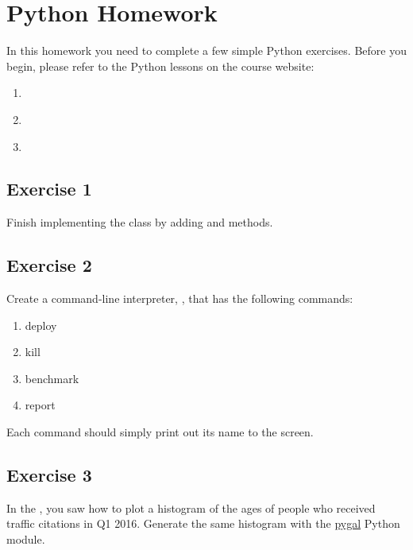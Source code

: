 \section{Python Homework}
\label{\detokenize{i524/python-homework::doc}}\label{\detokenize{i524/python-homework:python-homework}}
In this homework you need to complete a few simple Python
exercises. Before you begin, please refer to the Python lessons on the
course website:
\begin{enumerate}
\item {} 
{\hyperref[\detokenize{lesson/prg/python_intro::doc}]{}}

\item {} 
{\hyperref[\detokenize{lesson/prg/python_big_data::doc}]{}}

\item {} 
{\hyperref[\detokenize{lesson/prg/python_cmd::doc}]{}}

\end{enumerate}


\subsection{Exercise 1}
\label{\detokenize{i524/python-homework:exercise-1}}
Finish implementing the  class by adding  and
 methods.


\subsection{Exercise 2}
\label{\detokenize{i524/python-homework:exercise-2}}
Create a command-line interpreter, , that has the following
commands:
\begin{enumerate}
\item {} 
deploy

\item {} 
kill

\item {} 
benchmark

\item {} 
report

\end{enumerate}

Each command should simply print out its name to the screen.


\subsection{Exercise 3}
\label{\detokenize{i524/python-homework:exercise-3}}
In the {\hyperref[\detokenize{lesson/prg/python_big_data::doc}]{}}, you saw how to plot a histogram of
the ages of people who received traffic citations in Q1 2016. Generate
the same histogram with the \href{http://pygal.org/en/stable/}{pygal}
Python module.


